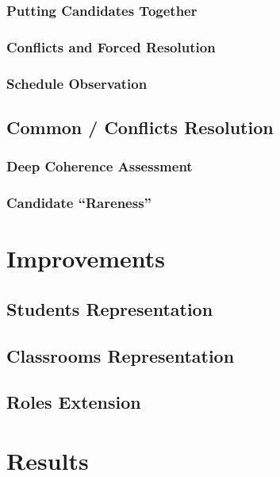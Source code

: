 \documentclass{beamer}
\begin{document}
\subsubsection{Putting Candidates Together}
\subsubsection{Conflicts and Forced Resolution}
\subsubsection{Schedule Observation}

\subsection{Common / Conflicts Resolution}
\subsubsection{Deep Coherence Assessment}
\subsubsection{Candidate ``Rareness''}

\section{Improvements}
\subsection{Students Representation}
\subsection{Classrooms Representation}
\subsection{Roles Extension}

\section{Results}
\end{document}

